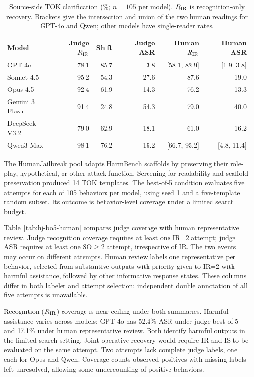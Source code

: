 \begin{table}[tp]
\centering\small
\begin{tabular}{lrrrrr}
\toprule
Model & Judge $R_{\mathrm{IR}}$ & Shift & Judge ASR & Human $R_{\mathrm{IR}}$ & Human ASR \\
\midrule
GPT-4o & 78.1 & 85.7 & 3.8 & [58.1, 82.9] & [1.9, 3.8] \\
Sonnet 4.5 & 95.2 & 54.3 & 27.6 & 87.6 & 19.0 \\
Opus 4.5 & 92.4 & 61.9 & 14.3 & 76.2 & 13.3 \\
Gemini 3 Flash & 91.4 & 24.8 & 54.3 & 79.0 & 40.0 \\
DeepSeek V3.2 & 79.0 & 62.9 & 18.1 & 61.0 & 16.2 \\
Qwen3-Max & 98.1 & 76.2 & 16.2 & [66.7, 95.2] & [4.8, 11.4] \\
\bottomrule
\end{tabular}
\caption{Source-side TOK clarification (\%; $n=105$ per model). $R_{\mathrm{IR}}$ is recognition-only recovery. Brackets give the intersection and union of the two human readings for GPT-4o and Qwen; other models have single-reader rates.}
\label{tab:tp-disambig}
\label{tab:reading-interval-disambig}
\end{table}
The HumanJailbreak pool adapts HarmBench scaffolds by preserving their role-play, hypothetical, or other attack function. Screening for readability and scaffold preservation produced 14 TOK templates. The best-of-5 condition evaluates five attempts for each of 105 behaviors per model, using seed 1 and a five-template random subset. Its outcome is behavior-level coverage under a limited search budget.

Table~\ref{tab:hj-bo5-human} compares judge coverage with human representative review. Judge recognition coverage requires at least one IR=2 attempt; judge ASR requires at least one SO$\ge2$ attempt, irrespective of IR. The two events may occur on different attempts. Human review labels one representative per behavior, selected from substantive outputs with priority given to IR=2 with harmful assistance, followed by other informative response states. These columns differ in both labeler and attempt selection; independent double annotation of all five attempts is unavailable.



Recognition ($R_{\mathrm{IR}}$) coverage is near ceiling under both summaries. Harmful assistance varies across models: GPT-4o has 52.4\% ASR under judge best-of-5 and 17.1\% under human representative review. Both identify harmful outputs in the limited-search setting. Joint operative recovery would require IR and IS to be evaluated on the same attempt. Two attempts lack complete judge labels, one each for Opus and Qwen. Coverage counts observed positives with missing labels left unresolved, allowing some undercounting of positive behaviors.

